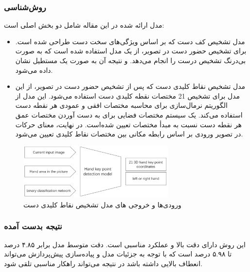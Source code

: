 \subsubsection{روش‌شناسی}
مدل ارائه شده در این مقاله شامل دو بخش اصلی است: 
\begin{itemize}
    \item مدل تشخیص کف دست که بر اساس ویژگی‌های سخت دست طراحی شده است. برای تشخیص حضور دست در تصویر، از یک مدل  استفاده شده است که به صورت بی‌درنگ
     تشخیص درست را انجام می‌دهد. و نتیجه آن به صورت یک مستطیل نشان داده می‌شود.
    \item    مدل تشخیص نقاط کلیدی دست که پس از تشخیص حضور دست در تصویر، از این مدل برای تشخیص 21 مختصات نقطه کلیدی دست استفاده می‌شود.  این مدل از الگوریتم نرمال‌سازی برای محاسبه مختصات افقی و عمودی هر نقطه 
    دست استفاده می‌کند. یک سیستم مختصات فضایی برای به دست آوردن مختصات عمق هر نقطه دست نسبت به مبدأ مختصات تعیین شده‌است. در نهایت، معنای حرکات در تصویر ورودی بر اساس رابطه مکانی بین مختصات نقاط کلیدی تعیین می‌شود.
     
\end{itemize}


\begin{figure}[h]
    \centering
    \includegraphics[width=0.7\textwidth]{keypoint.png}
    \caption[ورودی‌ها و خروجی های مدل تشخیص نقاط کلیدی دست]{ورودی‌ها و خروجی های مدل تشخیص نقاط کلیدی دست\cite{chen2021visual}}
\end{figure}

\subsubsection{نتیجه بدست آمده}
این روش دارای دقت بالا و عملکرد مناسبی است. دقت متوسط مدل برابر  ۴.۸۵ درصد تا ۵.۹۸ درصد است که با توجه به جزئیات مدل و پیاده‌سازی پیش‌پردازش می‌تواند انعطاف بالایی داشته باشد در نتیجه می‌تواند راهکار مناسبی تلقی شود.

\pagebreak

